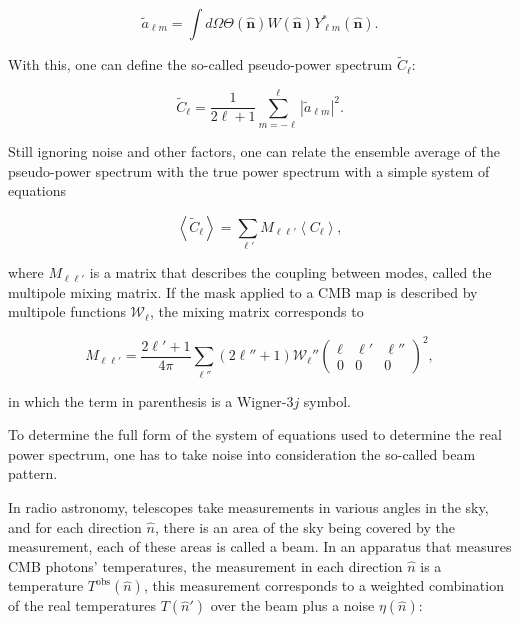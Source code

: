 \documentclass[openany,a4paper,12pt,oneside]{book}
\newcommand{\av}[1]{\left\langle #1 \right\rangle} %
\begin{document}
\begin{spacing}{1.5}
\begin{equation}\label{ch3:tilde_a}
    \tilde{a}_{\ell m}=\int d\Omega \Theta(\hat{\mathbf{n}})W(\hat{\mathbf{n}})Y_{\ell m}^* (\hat{\mathbf{n}}).
\end{equation}

With this, one can define the so-called pseudo-power spectrum $\tilde{C}_\ell$:

\begin{equation}\label{ch3:tilde_Cl}
    \tilde{C}_\ell=\frac{1}{2\ell+1}\sum_{m=-\ell}^\ell |\tilde{a}_{\ell m}|^2.
\end{equation}

Still ignoring noise and other factors, one can relate the ensemble average of the pseudo-power spectrum with the true power spectrum with a simple system of equations

\begin{equation}
    \av{\tilde{C}_\ell}=\sum_{\ell'} M_{\ell \ell'} \av{C_\ell},
\end{equation}

\noindent where $M_{\ell \ell'}$ is a matrix that describes the coupling between modes, called the multipole mixing matrix. If the mask applied to a CMB map is described by multipole functions $\mathcal{W}_\ell$, the mixing matrix corresponds to

\begin{equation}
    M_{\ell \ell'}=\frac{2\ell'+1}{4\pi}\sum_{\ell''}(2\ell''+1)\mathcal{W}_\ell''
    \begin{pmatrix}
        \ell & \ell' & \ell''\\
        0 & 0 & 0
    \end{pmatrix}^2,
\end{equation}

\noindent in which the term in parenthesis is a Wigner-$3j$ symbol.

To determine the full form of the system of equations used to determine the real power spectrum, one has to take noise into consideration the so-called beam pattern. 

In radio astronomy, telescopes take measurements in various angles in the sky, and for each direction $\hat{n}$, there is an area of the sky being covered by the measurement, each of these areas is called a beam. In an apparatus that measures CMB photons' temperatures, the measurement in each direction $\hat{n}$ is a temperature $T^\text{obs}(\hat{n})$, this measurement corresponds to a weighted combination of the real temperatures $T(\hat{n}')$ over the beam plus a noise $\eta(\hat{n})$:


\end{spacing}
\end{document}
